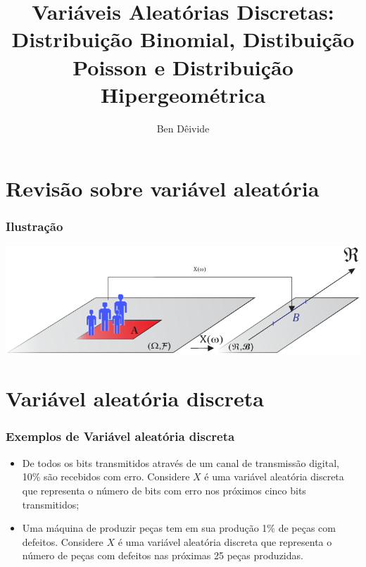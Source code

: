 \documentclass{beamer}
\title[Variáveis Aleatórias Discretas: Distribuição Binomial, Distibuição Poisson e Distribuição Hipergeométrica]{Variáveis Aleatórias Discretas: Distribuição Binomial, Distibuição Poisson e Distribuição Hipergeométrica} %
\author{Ben D\^eivide} %
\institute[UFLA] %
\theoremstyle{plain}
\begin{document}
\begin{frame}
\titlepage %
\end{frame}




\section{Revisão sobre variável aleatória}

  \begin{frame}
    \frametitle{Ilustração}
    \begin{center}
      \includegraphics[scale = 0.9]{ranvar}
    \end{center}
  \end{frame}


\section{Variável aleatória discreta}


\begin{frame}
	\frametitle{Exemplos de Variável aleatória discreta}
	\begin{itemize}
		\item De todos os bits transmitidos através de um canal de transmissão digital, 10\% são recebidos com erro. Considere $X$ é uma variável aleatória discreta que representa o número de bits com erro nos próximos cinco bits transmitidos;\pause
		\item Uma máquina de produzir peças tem em sua produção 1\% de peças com defeitos. Considere $X$ é uma variável aleatória discreta que representa o número de peças com defeitos nas próximas 25 peças produzidas.
	\end{itemize}
\end{frame}
\end{document}
